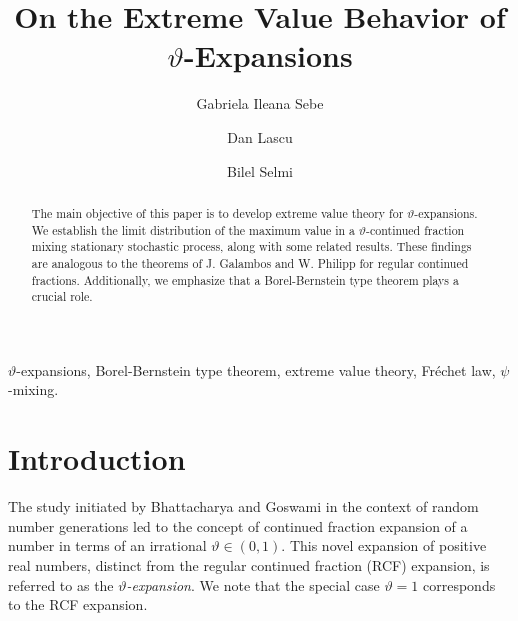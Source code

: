 \documentclass[final,1p,times]{elsarticle}
\numberwithin{equation}{section}
\begin{document}
\begin{frontmatter}

\title{On the Extreme Value Behavior of $\vartheta$-Expansions}

\author[upb,ismma]{Gabriela Ileana Sebe}
\address[upb]{Faculty of Applied Sciences, 
National University of Science and Technology  
POLITEHNICA Bucharest, \\ Splaiul Independentei 313, 060042, Bucharest, Romania}
\address[ismma]{Gheorghe Mihoc-Caius Iacob Institute of Mathematical Statistics and Applied Mathematics of the Romanian Academy, Calea 13 Sept. 13, 050711 Bucharest, Romania}

\author[anmb]{Dan Lascu}
\address[anmb]{Romanian Naval Academy ``Mircea cel Batran", 1 Fulgerului, 900218 Constanta, Romania}


\author[um]{Bilel Selmi}
\address[um]{Analysis, Probability and Fractals Laboratory LR18ES17, Department of Mathematics, Faculty of Sciences of Monastir, University of Monastir, 5000 Monastir, Tunisia}



\begin{abstract}
The main objective of this paper is to develop extreme value theory for $\vartheta$-expansions. We establish the limit distribution of the maximum value in a $\vartheta$-continued fraction mixing stationary stochastic process, along with some related results. These findings are analogous to the theorems of J. Galambos and W. Philipp for regular continued fractions. Additionally, we emphasize that a Borel-Bernstein type theorem plays a crucial role.
\end{abstract}
%
\begin{keyword}
$\vartheta$-expansions, Borel-Bernstein type theorem, extreme value theory, Fr\'echet law, $\psi$-mixing.
\end{keyword}

\end{frontmatter}

\sloppy


\section{Introduction}

The study initiated by Bhattacharya and Goswami \cite{BG-2000} in the context of random number generations led to the concept of continued fraction expansion of a number in terms of an irrational $\vartheta \in (0,1)$.  
This novel expansion of positive real numbers, distinct from the regular continued fraction (RCF) expansion, is referred to as the \textit{$\vartheta$-expansion}.  
We note that the special case $\vartheta = 1$ corresponds to the RCF expansion. 
\end{document}
